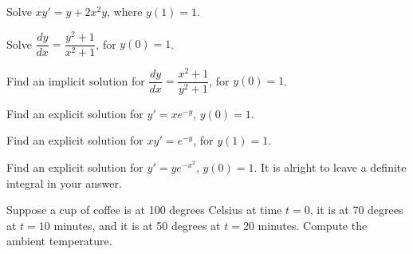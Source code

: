 \begin{exercise}
Solve $xy' = y + 2x^2 y$, where $y(1) = 1$.
\end{exercise}

\begin{exercise}
Solve $\dfrac{dy}{dx} = \dfrac{y^2+1}{x^2+1}$, for $y(0) = 1$.
\end{exercise}

\begin{exercise}
Find an implicit solution for
$\dfrac{dy}{dx} = \dfrac{x^2+1}{y^2+1}$, for $y(0) = 1$.
\end{exercise}

\begin{exercise}
Find an explicit solution for $y' = xe^{-y}$, $y(0)=1$.
\end{exercise}

\begin{exercise}
Find an explicit solution for $xy' = e^{-y}$, for $y(1)=1$.
\end{exercise}

\begin{exercise}
Find an explicit solution for $y' = ye^{-x^2}$, $y(0)=1$.  It is alright to
leave a definite integral in your answer.
\end{exercise}

\begin{exercise}
Suppose a cup of coffee is at 100 degrees Celsius at time $t=0$,
it is at 70 degrees at $t=10$ minutes, and it is at 50 degrees at $t=20$
minutes.  Compute the ambient temperature.
\end{exercise}

